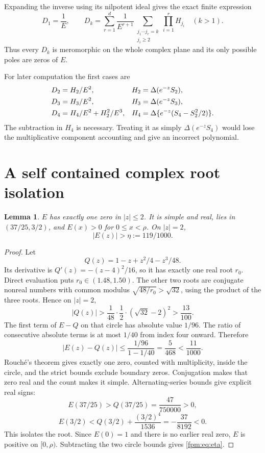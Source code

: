 \documentclass[11pt]{article}
\newtheorem{lemma}[theorem]{Lemma}
\theoremstyle{definition}\newtheorem{definition}[theorem]{Definition}
\theoremstyle{remark}\newtheorem{remark}[theorem]{Remark}
\begin{document}
Expanding the inverse using its nilpotent ideal gives the exact finite expression
\begin{equation}\label{fpm:eq:Dexplicit}
 D_1=\frac1E,\qquad
 D_k=\sum_{r=1}^{d}\frac1{E^{r+1}}
 \sum_{\substack{j_1\cdots j_r=k\\j_i\ge2}}\prod_{i=1}^rH_{j_i}
 \quad(k>1).
\end{equation}
Thus every $D_k$ is meromorphic on the whole complex plane and its only possible poles are zeros of $E$.

For later computation the first cases are
\begin{align}
 D_2&=H_2/E^2,&H_2&=\Delta(e^{-z}S_2),\notag\\
 D_3&=H_3/E^2,&H_3&=\Delta(e^{-z}S_3),\label{fpm:eq:lowD}\\
 D_4&=H_4/E^2+H_2^2/E^3,&H_4&=\Delta\{e^{-z}(S_4-S_2^2/2)\}.\notag
\end{align}
The subtraction in $H_4$ is necessary. Treating it as simply $\Delta(e^{-z}S_4)$ would lose the multiplicative component accounting and give an incorrect polynomial.

\section{A self contained complex root isolation}\label{fpm:sec:root}
\begin{lemma}\label{fpm:lem:root}
$E$ has exactly one zero in $|z|\le2$. It is simple and real, lies in $(37/25,3/2)$, and $E(x)>0$ for $0\le x<\rho$. On $|z|=2$,
\begin{equation}\label{fpm:eq:eta}
 |E(z)|>\eta:=119/1000.
\end{equation}
\end{lemma}
\begin{proof}
Let
\[
 Q(z)=1-z+z^2/4-z^3/48.
\]
Its derivative is $Q'(z)=-(z-4)^2/16$, so it has exactly one real root $r_0$. Direct evaluation puts $r_0\in(1.48,1.50)$. The other two roots are conjugate nonreal numbers with common modulus $\sqrt{48/r_0}>\sqrt{32}$, using the product of the three roots. Hence on $|z|=2$,
\[
 |Q(z)|>\frac1{48}\cdot\frac12\cdot(\sqrt{32}-2)^2>\frac{13}{100}.
\]
The first term of $E-Q$ on that circle has absolute value $1/96$. The ratio of consecutive absolute terms is at most $1/40$ from index four onward. Therefore
\[
 |E(z)-Q(z)|\le\frac{1/96}{1-1/40}=\frac5{468}<\frac{11}{1000}.
\]
Rouch\'e's theorem gives exactly one zero, counted with multiplicity, inside the circle, and the strict bounds exclude boundary zeros. Conjugation makes that zero real and the count makes it simple. Alternating-series bounds give explicit real signs:
\[
 E(37/25)>Q(37/25)=\frac{47}{750000}>0,
\]
\[
 E(3/2)<Q(3/2)+\frac{(3/2)^4}{1536}
 =-\frac{37}{8192}<0.
\]
This isolates the root. Since $E(0)=1$ and there is no earlier real zero, $E$ is positive on $[0,\rho)$. Subtracting the two circle bounds gives \eqref{fpm:eq:eta}.
\end{proof}
\end{document}
